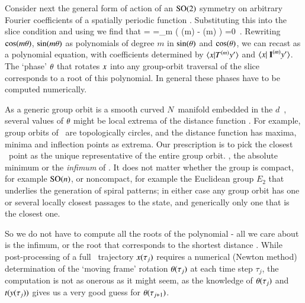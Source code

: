 Consider next the general form  of action
of an $\textrm{SO}(2)$ symmetry on arbitrary Fourier coefficients of a spatially periodic
function .
Substituting this into the slice condition  and using
 we find that
\bea
{}
=
\continue
=\sum\limits_m
   \left(
     \cos(m\gSpace)
  -  \sin(m\gSpace)
   \right)
   =0
\,.
\label{eq:so2sing}
\eea
Rewriting $\cos(m{\bf \theta})$, $\sin(m{\bf \theta})$ as
polynomials of degree $m$ in $\sin({\bf \theta})$ and $\cos({\bf \theta})$, we can recast
 as a polynomial equation, with coefficients
determined by $\braket{\ssp}{\Lg^{(m)} \slicep}$ and
$\braket{\ssp}{\id^{(m)}\slicep}$. The `phase' ${\bf \theta}$ that rotates
$x$ into any group-orbit traversal of the slice corresponds to a root of
this polynomial. In general these phases have to be computed
numerically.

As a generic group orbit is a smooth curved $N$\dmn\ manifold embedded in
the $d$\dmn\ \statesp, several values of ${\bf \theta}$ might be local extrema
of the distance function . For example, group orbits of
\ are topologically circles, and the distance function
 has maxima, minima and inflection points as extrema.
Our prescription is to pick the closest \reducedsp\ point as the unique
representative of the entire group orbit. \ie, the absolute minimum or
the \emph{infimum} of . It does not matter whether
the group is compact, for example $\textrm{SO}(n)$, or noncompact, for example
the Euclidean group $E_2$ that underlies the generation of spiral
patterns; in either case any group orbit has one or several
locally closest passages to the {\template} state, and generically only
one that is the closest one.

So we do not have to compute all the roots of the polynomial
 - all we care about is the infimum, or the root that
corresponds to the shortest distance .
While post-processing of a full \statesp\ trajectory $x(\tau_j)$
requires a numerical (Newton method) determination of the
`moving frame' rotation
${\bf \theta}(\tau_j)$ at each time step $\tau_j$, the computation is not
as onerous as it might seem, as the knowledge of ${\bf \theta}(\tau_j)$ and
$t(y(\tau_j))$
gives us a very good guess for ${\bf \theta}(\tau_{j+1})$.


%
